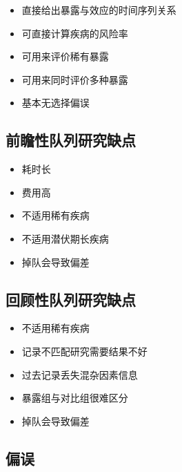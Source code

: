 \documentclass[
]{book}
\providecommand{\tightlist}{%
  \setlength{\itemsep}{0pt}\setlength{\parskip}{0pt}}
\begin{document}
\begin{itemize}
\tightlist
\item
  直接给出暴露与效应的时间序列关系
\item
  可直接计算疾病的风险率
\item
  可用来评价稀有暴露
\item
  可用来同时评价多种暴露
\item
  基本无选择偏误
\end{itemize}

\hypertarget{ux524dux77bbux6027ux961fux5217ux7814ux7a76ux7f3aux70b9}{%
\subsection{前瞻性队列研究缺点}\label{ux524dux77bbux6027ux961fux5217ux7814ux7a76ux7f3aux70b9}}

\begin{itemize}
\tightlist
\item
  耗时长
\item
  费用高
\item
  不适用稀有疾病
\item
  不适用潜伏期长疾病
\item
  掉队会导致偏差
\end{itemize}

\hypertarget{ux56deux987eux6027ux961fux5217ux7814ux7a76ux7f3aux70b9}{%
\subsection{回顾性队列研究缺点}\label{ux56deux987eux6027ux961fux5217ux7814ux7a76ux7f3aux70b9}}

\begin{itemize}
\tightlist
\item
  不适用稀有疾病
\item
  记录不匹配研究需要结果不好
\item
  过去记录丢失混杂因素信息
\item
  暴露组与对比组很难区分
\item
  掉队会导致偏差
\end{itemize}

\hypertarget{ux504fux8bef}{%
\subsection{偏误}\label{ux504fux8bef}}
\end{document}
